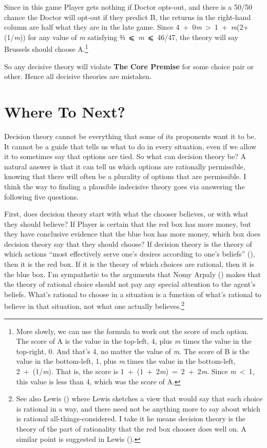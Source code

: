 \documentclass[
  10pt,
  letterpaper,
  DIV=11,
  numbers=noendperiod,
  twoside]{scrartcl}
\begin{document}
Since in this game Player gets nothing if Doctor opts-out, and there is
a 50/50 chance the Doctor will opt-out if they predict B, the returns in
the right-hand column are half what they are in the late game. Since
4~+~0\emph{m}~\textgreater~1~+~\emph{m}(2+(1/\emph{m})) for any value of
\emph{m} satisfying ⅔~⩽~\emph{m}~⩽~46/47, the theory will say Brussels
should choose A.\footnote{More slowly, we can use the formula to work
  out the score of each option. The score of A is the value in the
  top-left, 4, plus \emph{m} times the value in the top-right, 0. And
  that's 4, no matter the value of \emph{m}. The score of B is the value
  in the bottom-left, 1, plus \emph{m} times the value in the
  bottom-left, 2~+~(1/\emph{m}). That is, the score is
  1~+~(1~+~2\emph{m})~=~2~+~2\emph{m}. Since \emph{m}~\textless~1, this
  value is less than 4, which was the score of A.}

So any decisive theory will violate \textbf{The Core Premise} for some
choice pair or other. Hence all decisive theories are mistaken.

\section{Where To Next?}\label{where-to-next}

Decision theory cannot be everything that some of its proponents want it
to be. It cannot be a guide that tells us what to do in every situation,
even if we allow it to sometimes say that options are tied. So what can
decision theory be? A natural answer is that it can tell us which
options are rationally permissible, knowing that there will often be a
plurality of options that are permissible. I think the way to finding a
plausible indecisive theory goes via answering the following five
questions.

First, does decision theory start with what the chooser believes, or
with what they should believe? If Player is certain that the red box has
more money, but they have conclusive evidence that the blue box has more
money, which box does decision theory say that they should choose? If
decision theory is the theory of which actions ``most effectively serve
one's desires according to one's beliefs''
(), then it is the
red box. If it is the theory of which choices are rational, then it is
the blue box. I'm sympathetic to the arguments that Nomy Arpaly
() makes that the theory of rational
choice should not pay any special attention to the agent's beliefs.
What's rational to choose in a situation is a function of what's
rational to believe in that situation, not what one actually
believes.\footnote{See also Lewis
  () where Lewis sketches a
  view that would say that each choice is rational in a way, and there
  need not be anything more to say about which is rational
  all-things-considered. I take it he means decision theory is the
  theory of the part of rationality that the red box chooser does well
  on. A similar point is suggested in Lewis
  ().}
\end{document}
